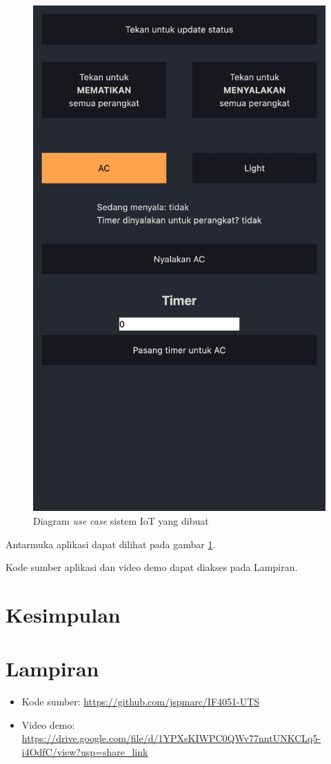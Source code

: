 \documentclass[conference]{IEEEtran}
\begin{document}
\begin{figure}[htbp]
\centerline{\includegraphics[scale=0.2]{other-images/messageImage_1679385387006.jpg}}
\caption{Diagram \textit{use case} sistem IoT yang dibuat}
\label{img-interface}
\end{figure}

Antarmuka aplikasi dapat dilihat pada gambar \ref{img-interface}.

Kode sumber aplikasi dan video demo dapat diakses pada Lampiran.

\section{Kesimpulan}\label{sect-kesimpulan}

\section*{Lampiran}

\begin{itemize}
    \item Kode sumber: \url{https://github.com/jspmarc/IF4051-UTS}
    \item Video demo: \url{https://drive.google.com/file/d/1YPXsKIWPC0QWv77nntUNKCLq5-i4OdfC/view?usp=share_link}
\end{itemize}
\end{document}

